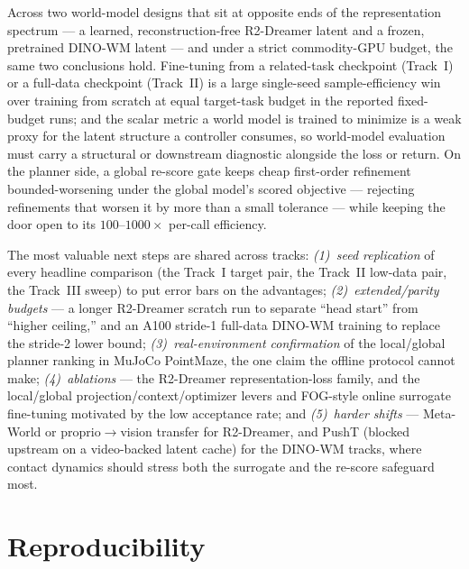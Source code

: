 \documentclass[11pt,a4paper]{article}
\begin{document}
Across two world-model designs that sit at opposite ends of the representation
spectrum --- a learned, reconstruction-free R2-Dreamer latent and a frozen,
pretrained DINO-WM latent --- and under a strict commodity-GPU budget, the same
two conclusions hold. Fine-tuning from a related-task checkpoint (Track~I) or a
full-data checkpoint (Track~II) is a large single-seed sample-efficiency win over
training from scratch at equal target-task budget in the reported fixed-budget runs; and
the scalar metric a world model is trained to minimize is a weak proxy for the
latent structure a controller consumes, so world-model evaluation must carry a
structural or downstream diagnostic alongside the loss or return. On the planner
side, a global re-score gate keeps cheap first-order refinement bounded-worsening
under the global model's scored objective --- rejecting refinements that worsen
it by more than a small tolerance --- while keeping the door open to its
$100$--$1000\times$ per-call efficiency.

The most valuable next steps are shared across tracks: \emph{(1)~seed
replication} of every headline comparison (the Track~I target pair, the Track~II
low-data pair, the Track~III sweep) to put error bars on the advantages;
\emph{(2)~extended/parity budgets} --- a longer R2-Dreamer scratch run to
separate ``head start'' from ``higher ceiling,'' and an A100 stride-1 full-data
DINO-WM training to replace the stride-2 lower bound; \emph{(3)~real-environment
confirmation} of the local/global planner ranking in MuJoCo PointMaze, the one
claim the offline protocol cannot make; \emph{(4)~ablations} --- the R2-Dreamer
representation-loss family, and the local/global projection/context/optimizer
levers and FOG-style online surrogate fine-tuning motivated by the low
acceptance rate; and \emph{(5)~harder shifts} --- Meta-World or
proprio$\rightarrow$vision transfer for R2-Dreamer, and PushT (blocked upstream
on a video-backed latent cache) for the DINO-WM tracks, where contact dynamics
should stress both the surrogate and the re-score safeguard most.

\section*{Reproducibility}
\end{document}
